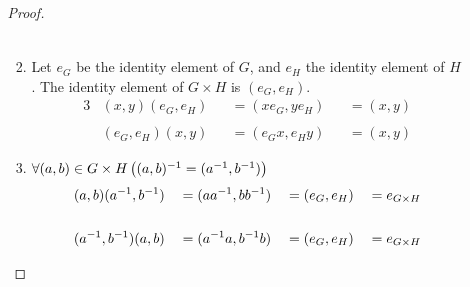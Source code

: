 \begin{enumerate}[label={\Alph*.},font={\bfseries}]
\begin{enumerate}[label={\arabic*},font={\bfseries}]
\begin{proof}
\begin{enumerate}[label={(G\arabic*)}]
\begin{align*}
        \end{align*}
      \item Let $e_G$ be the identity element of $G$, and $e_H$ the identity element of $H$.
        The identity element of $G \times H$ is $(e_G,e_H)$.
        \begin{alignat*}{3}
          &(x,y)(e_G,e_H) &&= (xe_G,ye_H) &&= (x,y) \\
          \\
          &(e_G,e_H)(x,y) &&= (e_Gx,e_Hy) &&= (x,y)
        \end{alignat*}
      \item $\forall (a,b) \in G \times H \left( (a,b)^{-1} = (a^{-1},b^{-1}) \right)$
        \begin{alignat*}{4}
          &(a,b)(a^{-1},b^{-1}) &&= (aa^{-1},bb^{-1}) &&= (e_G,e_H) &&= e_{G \times H}\\
          \\
          &(a^{-1},b^{-1})(a,b) &&= ({a^{-1}}a,{b^{-1}}b) &&= (e_G,e_H) &&= e_{G \times H}
        \end{alignat*}
      \end{enumerate}
    \end{proof}
  \end{enumerate}
\end{enumerate}
